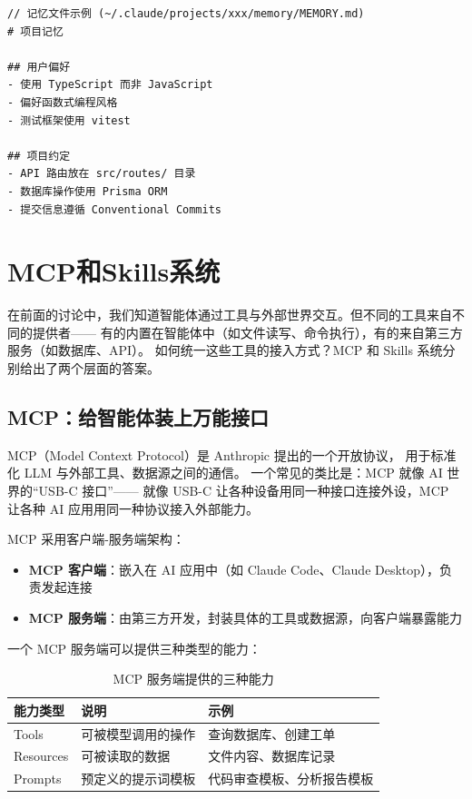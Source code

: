 \begin{verbatim}
// 记忆文件示例 (~/.claude/projects/xxx/memory/MEMORY.md)
# 项目记忆

## 用户偏好
- 使用 TypeScript 而非 JavaScript
- 偏好函数式编程风格
- 测试框架使用 vitest

## 项目约定
- API 路由放在 src/routes/ 目录
- 数据库操作使用 Prisma ORM
- 提交信息遵循 Conventional Commits
\end{verbatim}

\section{MCP和Skills系统}

在前面的讨论中，我们知道智能体通过工具与外部世界交互。但不同的工具来自不同的提供者——
有的内置在智能体中（如文件读写、命令执行），有的来自第三方服务（如数据库、API）。
如何统一这些工具的接入方式？MCP 和 Skills 系统分别给出了两个层面的答案。

\subsection{MCP：给智能体装上万能接口}
MCP（Model Context Protocol）是 Anthropic 提出的一个开放协议，
用于标准化 LLM 与外部工具、数据源之间的通信。
一个常见的类比是：MCP 就像 AI 世界的“USB-C 接口”——
就像 USB-C 让各种设备用同一种接口连接外设，MCP 让各种 AI 应用用同一种协议接入外部能力。

MCP 采用客户端-服务端架构：

\begin{itemize}
	\item \textbf{MCP 客户端}：嵌入在 AI 应用中（如 Claude Code、Claude Desktop），负责发起连接
	\item \textbf{MCP 服务端}：由第三方开发，封装具体的工具或数据源，向客户端暴露能力
\end{itemize}

一个 MCP 服务端可以提供三种类型的能力：

\begin{table}[H]
	\centering
	\begin{tabular}{|l|l|l|}
		\hline
		\textbf{能力类型} & \textbf{说明} & \textbf{示例}   \\
		\hline
		Tools         & 可被模型调用的操作   & 查询数据库、创建工单    \\
		Resources     & 可被读取的数据     & 文件内容、数据库记录    \\
		Prompts       & 预定义的提示词模板   & 代码审查模板、分析报告模板 \\
		\hline
	\end{tabular}
	\caption{MCP 服务端提供的三种能力}
\end{table}

